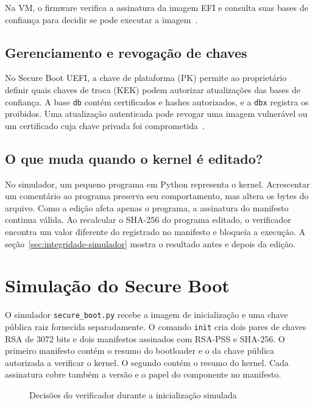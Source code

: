 \documentclass[12pt,a4paper,oneside,openany,brazil,chapter=TITLE,section=TITLE]{abntex2}
\begin{document}
Na VM, o firmware verifica a assinatura da imagem EFI e consulta suas bases de
confiança para decidir se pode executar a imagem~\cite{uefi}.

\section{Gerenciamento e revogação de chaves}

No Secure Boot UEFI, a chave de plataforma (PK) permite ao proprietário definir
quais chaves de troca (KEK) podem autorizar atualizações das bases de confiança.
A base \texttt{db} contém certificados e hashes autorizados, e a \texttt{dbx}
registra os proibidos. Uma
atualização autenticada pode revogar uma imagem vulnerável ou um certificado
cuja chave privada foi comprometida~\cite{uefi}.

\section{O que muda quando o kernel é editado?}
\label{sec:exemplo-kernel}

No simulador, um pequeno programa em Python representa o kernel. Acrescentar
um comentário ao programa preserva seu comportamento, mas altera os bytes do
arquivo. Como a edição afeta apenas o programa, a assinatura do manifesto
continua válida. Ao recalcular o SHA-256 do programa editado, o verificador
encontra um valor diferente do registrado no manifesto e bloqueia a execução.
A seção~\ref{sec:integridade-simulador} mostra o resultado antes e depois da edição.

\chapter{Simulação do Secure Boot}

O simulador \texttt{secure\_boot.py} recebe a imagem de inicialização e uma chave
pública raiz fornecida separadamente. O comando \texttt{init} cria dois pares de
chaves RSA de 3072 bits e dois manifestos assinados com RSA-PSS e SHA-256.
O primeiro manifesto contém o resumo do bootloader e o da chave pública
autorizada a verificar o kernel. O segundo contém o resumo do kernel. Cada
assinatura cobre também a versão e o papel do componente no manifesto.

\begin{figure}[H]
  \centering
  \caption{Decisões do verificador durante a inicialização simulada}
  \label{fig:fluxo}
  
\end{figure}
\end{document}
